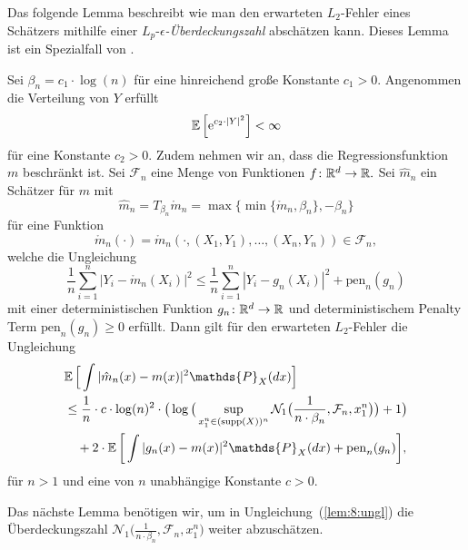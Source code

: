 Das folgende Lemma beschreibt wie man den erwarteten $L_2$-Fehler eines Schätzers mithilfe einer $L_p$-$\epsilon$\textit{-Überdeckungszahl} abschätzen kann. Dieses Lemma ist ein Spezialfall von \cite[Lemma 8]{kohler19}.
  \begin{lem}
  \label{lem:8}
Sei $\beta_n = c_1 \cdot \log(n)$ für eine hinreichend große Konstante $c_1 > 0$. Angenommen die Verteilung von $Y$ erfüllt 
$$ \mathbb{E}\,\Big[\mathrm{e}^{c_2 \cdot |Y|^2}\Big] < \infty$$
für eine Konstante $c_2 > 0.$ Zudem nehmen wir an, dass die Regressionsfunktion~$m$ beschränkt ist. Sei $\mathcal{F}_n$ eine Menge von Funktionen $f\colon \mathbb{R}^d \to \mathbb{R}.$ Sei $\hat{m}_n$ ein Schätzer für $m$ mit
$$\hat{m}_n = T_{\beta_n}\mathring{m}_n = \max\big\{\min\{\mathring{m}_n, \beta_n\}, -\beta_n\big\}$$ 
für eine Funktion
$$\mathring{m}_n(\cdot) = \mathring{m}_n(\cdot,(X_1, Y_1),\dots,(X_n, Y_n)) \in \mathcal{F}_n,$$
welche die Ungleichung
\begin{equation}
\label{lem:8:bed:1}
\frac{1}{n} \sum_{i = 1}^n |Y_i - \mathring{m}_n(X_i)|^2 \leq \frac{1}{n}\sum_{i = 1}^n |Y_i - g_{n}(X_i)|^2 + \mathrm{pen}_n(g_n)
\end{equation}
mit einer deterministischen Funktion $g_{n}\colon \mathbb{R}^d \to \mathbb{R}$ und deterministischem Penalty Term $\mathrm{pen}_n(g_{n}) \geq 0$ erfüllt.
Dann gilt für den erwarteten $L_2$-Fehler die Ungleichung
\begin{equation}
\label{lem:8:ungl}
\begin{split}
& \E \Big[\int |\hat{m}_n(x) - m(x)|^2 \mathds{P}_X(dx)\Big] \\
& \leq \frac{1}{n} \cdot c \cdot \log(n)^2 \cdot \big(\log\big(\sup_{x_1^n \in (\supp(X))^n}\mathcal{N}_1\big(\frac{1}{n \cdot \beta_n},\mathcal{F}_n,x_1^n\big)\big) + 1\big) \\
& \quad + 2 \cdot \E\bigg[\int |g_{n}(x) - m(x)|^2 \mathds{P}_X(dx) + \mathrm{pen}_n(g_{n})\bigg],
\end{split}
\end{equation}
für $n > 1$ und eine von $n$ unabhängige Konstante $c > 0$.
  \end{lem}
Das nächste Lemma benötigen wir, um in Ungleichung~(\ref{lem:8:ungl}) die Überdeckungszahl $\mathcal{N}_1\big(\frac{1}{n \cdot \beta_n},\mathcal{F}_n,x_1^n\big)$ weiter abzuschätzen.
